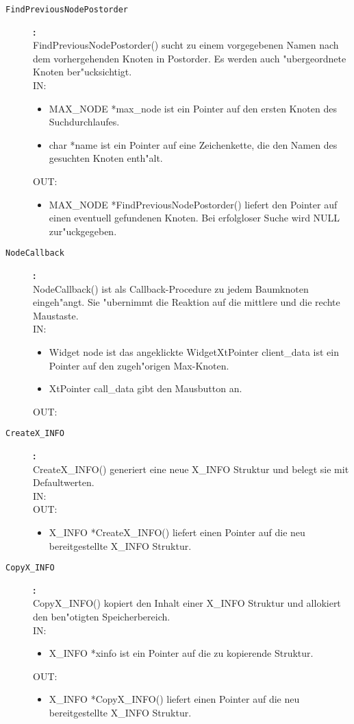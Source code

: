 \begin{description}
\item[\tt FindPreviousNodePostorder]{\bf :\\}
FindPreviousNodePostorder() sucht zu einem vorgegebenen Namen nach dem vorhergehenden Knoten in Postorder. Es werden auch "ubergeordnete Knoten ber"ucksichtigt. \\
IN:
\begin{itemize}
   \item MAX\_NODE *max\_node ist ein Pointer auf den ersten Knoten des Suchdurchlaufes.
   \item char *name ist ein Pointer auf eine Zeichenkette, die den Namen des gesuchten Knoten enth"alt.
\end{itemize}
OUT:
\begin{itemize}
   \item MAX\_NODE *FindPreviousNodePostorder() liefert den Pointer auf einen eventuell gefundenen Knoten. Bei erfolgloser Suche wird NULL zur"uckgegeben.
\end{itemize}

\item[\tt NodeCallback]{\bf :\\}
NodeCallback() ist als Callback-Procedure zu jedem Baumknoten eingeh"angt. Sie "ubernimmt die Reaktion auf die mittlere und die rechte Maustaste. \\
IN:
\begin{itemize}
   \item Widget node ist das angeklickte WidgetXtPointer client\_data ist ein Pointer auf den zugeh"origen Max-Knoten.
   \item XtPointer call\_data gibt den Mausbutton an.
\end{itemize}
OUT:

\item[\tt CreateX\_INFO]{\bf :\\}
CreateX\_INFO() generiert eine neue X\_INFO Struktur und belegt sie mit Defaultwerten. \\
IN: \\
OUT:
\begin{itemize}
   \item X\_INFO *CreateX\_INFO() liefert einen Pointer auf die neu bereitgestellte X\_INFO Struktur.
\end{itemize}

\item[\tt CopyX\_INFO]{\bf :\\}
CopyX\_INFO() kopiert den Inhalt einer X\_INFO Struktur und allokiert den ben"otigten Speicherbereich. \\
IN:
\begin{itemize}
   \item X\_INFO *xinfo ist ein Pointer auf die zu kopierende Struktur.
\end{itemize}
OUT:
\begin{itemize}
   \item X\_INFO *CopyX\_INFO() liefert einen Pointer auf die neu bereitgestellte X\_INFO Struktur.
\end{itemize}


\end{description}
